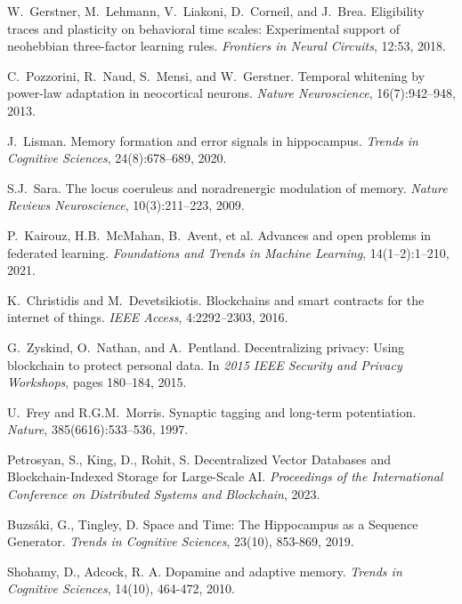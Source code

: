 \documentclass[11pt]{article}
\begin{document}
\begin{thebibliography}{99}
W.~Gerstner, M.~Lehmann, V.~Liakoni, D.~Corneil, and J.~Brea.
\newblock Eligibility traces and plasticity on behavioral time scales: Experimental support of neohebbian three-factor learning rules.
\newblock \emph{Frontiers in Neural Circuits}, 12:53, 2018.

C.~Pozzorini, R.~Naud, S.~Mensi, and W.~Gerstner.
\newblock Temporal whitening by power-law adaptation in neocortical neurons.
\newblock \emph{Nature Neuroscience}, 16(7):942--948, 2013.

J.~Lisman.
\newblock Memory formation and error signals in hippocampus.
\newblock \emph{Trends in Cognitive Sciences}, 24(8):678--689, 2020.

S.J.~Sara.
\newblock The locus coeruleus and noradrenergic modulation of memory.
\newblock \emph{Nature Reviews Neuroscience}, 10(3):211--223, 2009.

P.~Kairouz, H.B.~McMahan, B.~Avent, et al.
\newblock Advances and open problems in federated learning.
\newblock \emph{Foundations and Trends in Machine Learning}, 14(1--2):1--210, 2021.

K.~Christidis and M.~Devetsikiotis.
\newblock Blockchains and smart contracts for the internet of things.
\newblock \emph{IEEE Access}, 4:2292--2303, 2016.

G.~Zyskind, O.~Nathan, and A.~Pentland.
\newblock Decentralizing privacy: Using blockchain to protect personal data.
\newblock In \emph{2015 IEEE Security and Privacy Workshops}, pages 180--184, 2015.

U.~Frey and R.G.M.~Morris.
\newblock Synaptic tagging and long-term potentiation.
\newblock \emph{Nature}, 385(6616):533--536, 1997.

Petrosyan, S., King, D., Rohit, S.
\newblock Decentralized Vector Databases and Blockchain-Indexed Storage for Large-Scale AI.
\newblock \emph{Proceedings of the International Conference on Distributed Systems and Blockchain}, 2023.

Buzsáki, G., Tingley, D.
\newblock Space and Time: The Hippocampus as a Sequence Generator.
\newblock \emph{Trends in Cognitive Sciences}, 23(10), 853-869, 2019.

Shohamy, D., Adcock, R. A.
\newblock Dopamine and adaptive memory.
\newblock \emph{Trends in Cognitive Sciences}, 14(10), 464-472, 2010.


\end{thebibliography}
\end{document}
